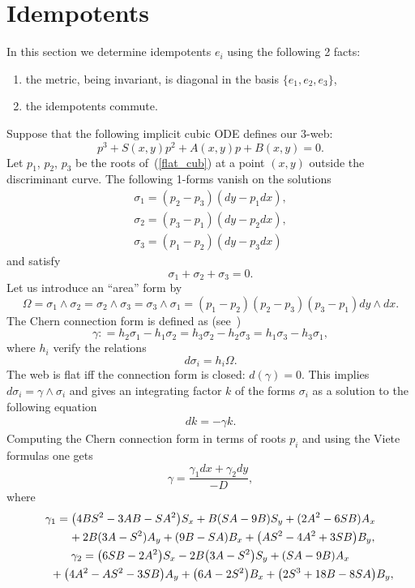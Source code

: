 \section{Idempotents}
In this section we determine idempotents $e_i$ using the following 2 facts:
\begin{enumerate}\itemsep=0pt
\item[1)] the metric, being invariant, is diagonal in the basis $\{e_1,e_2,e_3\}$,
\item[2)] the idempotents commute.
\end{enumerate}
Suppose that the following implicit cubic ODE def\/ines our $3$-web:
\begin{equation}\label{flat_cub}
p^3+S(x,y)p^2+A(x,y)p+B(x,y)=0.
\end{equation}
Let $p_1$, $p_2$, $p_3$ be the roots of~(\ref{flat_cub}) at a point
$(x,y)$ outside the discriminant curve. The following 1-forms vanish on the
solutions
\begin{gather}
\sigma_1=(p_2-p_3)(dy-p_1dx),\nonumber\\
\sigma_2=(p_3-p_1)(dy-p_2dx),\nonumber\\
\sigma_3=(p_1-p_2)(dy-p_3dx)\label{normalized forms}
\end{gather}
and satisfy
\[
\sigma_1+\sigma_2 + \sigma_3=0.
\]
Let us introduce an ``area'' form by
\[
\Omega =\sigma_1\wedge
\sigma_2=\sigma_2\wedge \sigma_3=\sigma_3\wedge
\sigma_1=(p_1-p_2)(p_2-p_3)(p_3-p_1)dy\wedge dx.
\]
 The Chern
connection form is def\/ined as (see~\cite{Be})
\[
\gamma:
=h_2\sigma_1-h_1\sigma_2=h_3\sigma_2-h_2\sigma_3=h_1\sigma_3-h_3\sigma_1,
\]
where $h_i$ verify the relations
\[
d\sigma_i=h_i\Omega.
\]
The web is f\/lat if\/f the connection form
is closed: $d(\gamma)=0$. This implies $d\sigma_i=\gamma \wedge \sigma_i$ and gives an integrating factor $k$ of the forms $\sigma_i$ as a solution to the following equation
\begin{gather*}%
dk=-\gamma k.
\end{gather*}
Computing the Chern connection form in terms of roots $p_i$ and using the Viete formulas one gets
\[
\gamma =\frac{\gamma_1dx+\gamma_2dy}{-D},
\]
where
\begin{gather*}
\gamma_1=\big(4BS^2-3AB-SA^2\big)S_x+B(SA-9B)S_y+(2A^2-6SB)A_x\nonumber\\
\hphantom{\gamma_1=}{}
+2B(3A-S^2)A_y+(9B-SA)B_x+\big(AS^2-4A^2+3SB\big)B_y,\nonumber\\
\gamma_2=\big(6SB-2A^2\big)S_x-2B\big(3A-S^2\big)S_y+(SA-9B)A_x\nonumber\\
\hphantom{\gamma_2=}{}
 + \big(4A^2-AS^2-3SB\big)A_y+\big(6A-2S^2\big)B_x+\big(2S^3+18B-8SA\big)B_y,%
\end{gather*}

